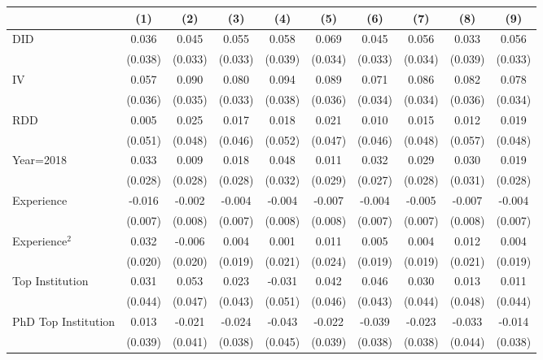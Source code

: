 \begin{tabular}{l*{9}{c}}
\hline\hline
                &\multicolumn{1}{c}{(1)}&\multicolumn{1}{c}{(2)}&\multicolumn{1}{c}{(3)}&\multicolumn{1}{c}{(4)}&\multicolumn{1}{c}{(5)}&\multicolumn{1}{c}{(6)}&\multicolumn{1}{c}{(7)}&\multicolumn{1}{c}{(8)}&\multicolumn{1}{c}{(9)}\\
\hline
DID             &    0.036&    0.045&    0.055&    0.058&    0.069&    0.045&    0.056&    0.033&    0.056\\
                &  (0.038)&  (0.033)&  (0.033)&  (0.039)&  (0.034)&  (0.033)&  (0.034)&  (0.039)&  (0.033)\\
IV              &    0.057&    0.090&    0.080&    0.094&    0.089&    0.071&    0.086&    0.082&    0.078\\
                &  (0.036)&  (0.035)&  (0.033)&  (0.038)&  (0.036)&  (0.034)&  (0.034)&  (0.036)&  (0.034)\\
RDD             &    0.005&    0.025&    0.017&    0.018&    0.021&    0.010&    0.015&    0.012&    0.019\\
                &  (0.051)&  (0.048)&  (0.046)&  (0.052)&  (0.047)&  (0.046)&  (0.048)&  (0.057)&  (0.048)\\
Year=2018       &    0.033&    0.009&    0.018&    0.048&    0.011&    0.032&    0.029&    0.030&    0.019\\
                &  (0.028)&  (0.028)&  (0.028)&  (0.032)&  (0.029)&  (0.027)&  (0.028)&  (0.031)&  (0.028)\\
Experience      &   -0.016&   -0.002&   -0.004&   -0.004&   -0.007&   -0.004&   -0.005&   -0.007&   -0.004\\
                &  (0.007)&  (0.008)&  (0.007)&  (0.008)&  (0.008)&  (0.007)&  (0.007)&  (0.008)&  (0.007)\\
Experience$^2$  &    0.032&   -0.006&    0.004&    0.001&    0.011&    0.005&    0.004&    0.012&    0.004\\
                &  (0.020)&  (0.020)&  (0.019)&  (0.021)&  (0.024)&  (0.019)&  (0.019)&  (0.021)&  (0.019)\\
Top Institution &    0.031&    0.053&    0.023&   -0.031&    0.042&    0.046&    0.030&    0.013&    0.011\\
                &  (0.044)&  (0.047)&  (0.043)&  (0.051)&  (0.046)&  (0.043)&  (0.044)&  (0.048)&  (0.044)\\
PhD Top Institution&    0.013&   -0.021&   -0.024&   -0.043&   -0.022&   -0.039&   -0.023&   -0.033&   -0.014\\
                &  (0.039)&  (0.041)&  (0.038)&  (0.045)&  (0.039)&  (0.038)&  (0.038)&  (0.044)&  (0.038)\\

\end{tabular}
